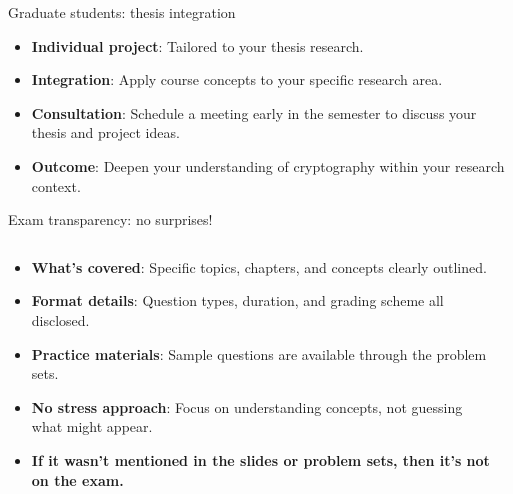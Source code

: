 \documentclass[aspectratio=169, lualatex, handout]{beamer}
\begin{document}
\begin{frame}{Graduate students: thesis integration}
	\vspace{0.1cm}
	\begin{itemize}[<+->]
		\item \textbf{Individual project}: Tailored to your thesis research.
		\item \textbf{Integration}: Apply course concepts to your specific research area.
		\item \textbf{Consultation}: Schedule a meeting early in the semester to discuss your thesis and project ideas.
		\item \textbf{Outcome}: Deepen your understanding of cryptography within your research context.
	\end{itemize}
\end{frame}

\begin{frame}{Exam transparency: no surprises!}
	\begin{columns}[c]
		\begin{column}{0.65\textwidth}
			\begin{itemize}[<+->]
				\item \textbf{What's covered}: Specific topics, chapters, and concepts clearly outlined.
				\item \textbf{Format details}: Question types, duration, and grading scheme all disclosed.
				\item \textbf{Practice materials}: Sample questions are available through the problem sets.
				\item \textbf{No stress approach}: Focus on understanding concepts, not guessing what might appear.
				\item \textbf{If it wasn't mentioned in the slides or problem sets, then it's not on the exam.}
			\end{itemize}
		\end{column}
		\begin{column}{0.35\textwidth}
		\end{column}
	\end{columns}
\end{frame}
\end{document}
